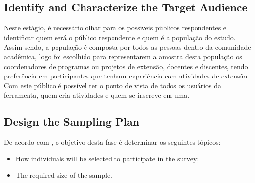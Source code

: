 \subsection{Identify and Characterize the Target Audience} \label{sec:survey-targets}
Neste estágio, é necessário olhar para os possíveis públicos respondentes e identificar quem será o público respondente e quem é a população do estudo. Assim sendo, a população é composta por todos as pessoas dentro da comunidade acadêmica, logo foi escolhido para representarem a amostra desta população os coordenadores de programas ou projetos de extensão, docentes e discentes, tendo preferência em participantes que tenham experiência com atividades de extensão. Com este público é possível ter o ponto de vista de todos os usuários da ferramenta, quem cria atividades e quem se inscreve em uma.


\subsection{Design the Sampling Plan} \label{sec:survey-sampling}

De acordo com , o objetivo desta fase é determinar os seguintes tópicos:
\begin{itemize}
    \item How individuals will be selected to participate in the survey;
    \item The required size of the sample.
\end{itemize}

